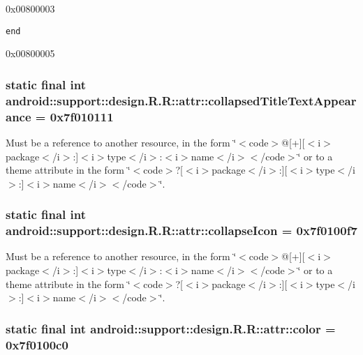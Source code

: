 0x00800003

{\tt end}

0x00800005\hypertarget{classandroid_1_1support_1_1design_1_1_r_1_1attr_cb95cf12ecbd47a9e05566f865232763}{
\subsubsection[{collapsedTitleTextAppearance}]{\setlength{\rightskip}{0pt plus 5cm}static final int android::support::design.R.R::attr::collapsedTitleTextAppearance = 0x7f010111}}
\label{classandroid_1_1support_1_1design_1_1_r_1_1attr_cb95cf12ecbd47a9e05566f865232763}


Must be a reference to another resource, in the form \char`\"{}$<$code$>$@\mbox{[}+\mbox{]}\mbox{[}$<$i$>$package$<$/i$>$:\mbox{]}$<$i$>$type$<$/i$>$:$<$i$>$name$<$/i$>$$<$/code$>$\char`\"{} or to a theme attribute in the form \char`\"{}$<$code$>$?\mbox{[}$<$i$>$package$<$/i$>$:\mbox{]}\mbox{[}$<$i$>$type$<$/i$>$:\mbox{]}$<$i$>$name$<$/i$>$$<$/code$>$\char`\"{}. \hypertarget{classandroid_1_1support_1_1design_1_1_r_1_1attr_d65871470ebe94fa62d14d26910aee48}{
\subsubsection[{collapseIcon}]{\setlength{\rightskip}{0pt plus 5cm}static final int android::support::design.R.R::attr::collapseIcon = 0x7f0100f7}}
\label{classandroid_1_1support_1_1design_1_1_r_1_1attr_d65871470ebe94fa62d14d26910aee48}


Must be a reference to another resource, in the form \char`\"{}$<$code$>$@\mbox{[}+\mbox{]}\mbox{[}$<$i$>$package$<$/i$>$:\mbox{]}$<$i$>$type$<$/i$>$:$<$i$>$name$<$/i$>$$<$/code$>$\char`\"{} or to a theme attribute in the form \char`\"{}$<$code$>$?\mbox{[}$<$i$>$package$<$/i$>$:\mbox{]}\mbox{[}$<$i$>$type$<$/i$>$:\mbox{]}$<$i$>$name$<$/i$>$$<$/code$>$\char`\"{}. \hypertarget{classandroid_1_1support_1_1design_1_1_r_1_1attr_c431302cbddd414fd6d0dc9fb9e934d2}{
\subsubsection[{color}]{\setlength{\rightskip}{0pt plus 5cm}static final int android::support::design.R.R::attr::color = 0x7f0100c0}}
\label{classandroid_1_1support_1_1design_1_1_r_1_1attr_c431302cbddd414fd6d0dc9fb9e934d2}


